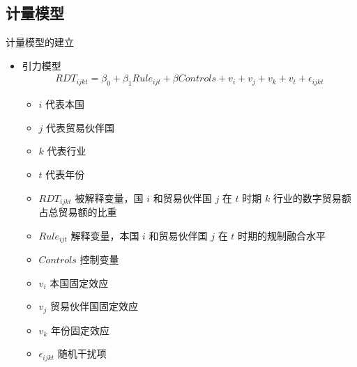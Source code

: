 \documentclass{beamer}
\begin{document}
\subsection{计量模型}
\begin{frame}{计量模型的建立}
    \begin{itemize}
        \item 引力模型
        \begin{gather*}
            RDT_{ijkt} = \beta_0 + \beta_1 Rule_{ijt} + \beta Controls + v_i + v_j + v_k + v_t + \epsilon_{ijkt} \tag{12}
        \end{gather*}
        \begin{itemize}
            \item $i$ 代表本国
            \item $j$ 代表贸易伙伴国
            \item $k$ 代表行业
            \item $t$ 代表年份
            \item $RDT_{ijkt}$ 被解释变量，国 $i$ 和贸易伙伴国 $j$ 在 $t$ 时期 $k$ 行业的数字贸易额占总贸易额的比重
            \item $Rule_{ijt}$ 解释变量，本国 $i$ 和贸易伙伴国 $j$ 在 $t$ 时期的规制融合水平
            \item $Controls$ 控制变量
            \item $v_i$ 本国固定效应
            \item $v_j$ 贸易伙伴国固定效应
            \item $v_k$ 年份固定效应
            \item $\epsilon_{ijkt}$ 随机干扰项
        \end{itemize}
    \end{itemize}
\end{frame}
\end{document}
